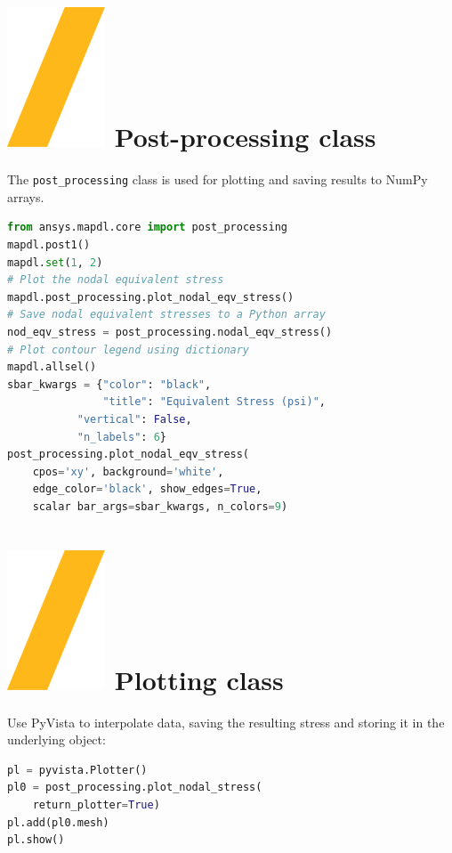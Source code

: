 \documentclass[9pt,landscape]{article}
\begin{document}
\begin{multicols}{3}
\section{\includegraphics[height=\fontcharht\font`\S]{slash.png} Post-processing class}
The \texttt{post\_processing} class is used for plotting and saving results to NumPy arrays.
\begin{lstlisting}[language=Python]
from ansys.mapdl.core import post_processing
mapdl.post1()
mapdl.set(1, 2)
# Plot the nodal equivalent stress
mapdl.post_processing.plot_nodal_eqv_stress()
# Save nodal equivalent stresses to a Python array
nod_eqv_stress = post_processing.nodal_eqv_stress()
# Plot contour legend using dictionary
mapdl.allsel()
sbar_kwargs = {"color": "black",
               "title": "Equivalent Stress (psi)",
	       "vertical": False,
	       "n_labels": 6}
post_processing.plot_nodal_eqv_stress(
    cpos='xy', background='white',
    edge_color='black', show_edges=True,
    scalar bar_args=sbar_kwargs, n_colors=9)
\end{lstlisting} 
\vfill

\section{\includegraphics[height=\fontcharht\font`\S]{slash.png} Plotting class}
Use PyVista to interpolate data, saving the resulting stress and storing it in the underlying  object:
\begin{lstlisting}[language=Python]
pl = pyvista.Plotter()
pl0 = post_processing.plot_nodal_stress(
    return_plotter=True)
pl.add(pl0.mesh)
pl.show()
\end{lstlisting} 


\end{multicols}
\end{document}
